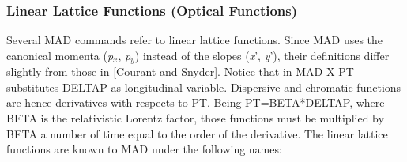 \subsubsection{\href{linear}{Linear Lattice Functions (Optical Functions)}} Several MAD commands refer to linear lattice functions. Since MAD uses the canonical momenta (\textit{p$_x$}, \textit{p$_y$}) instead of the slopes (\textit{x}', \textit{y}'), their definitions differ slightly from those in \href{bibliography.html#courant}{[Courant and Snyder]}. Notice that in MAD-X PT substitutes DELTAP as longitudinal variable. Dispersive and chromatic functions are hence derivatives with respects to PT. Being PT=BETA*DELTAP, where BETA is the relativistic Lorentz factor, those functions must be multiplied by BETA a number of time equal to the order of the derivative. The linear lattice functions are known to MAD under the following names: 
